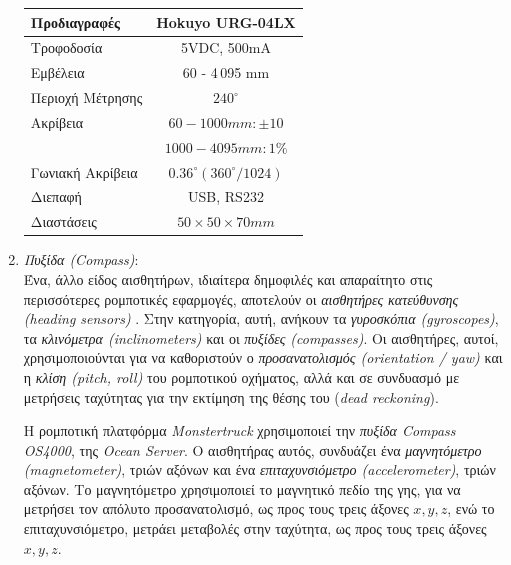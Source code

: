 \begin{enumerate}
\begin{table}[!ht]
	\centering
	\label{tab:hokuyo_specs}
	\begin{tabular}{| l | c |}
		\hline
	   \textbf{Προδιαγραφές} & \textbf{Hokuyo URG-04LX} \\ \hline
	   Τροφοδοσία & 5VDC, 500mA\\ \hline
	   Εμβέλεια & 60 - 4\,095 mm \\ \hline
	   Περιοχή Μέτρησης & $240^{\circ}$\\ \hline
	   Ακρίβεια & $60 - 1000mm: \pm 10$ \\
   		& $1000 - 4095mm: 1\%$ \\ \hline
	  	Γωνιακή Ακρίβεια & $0.36^{\circ} (360^{\circ}/1024)$ \\ \hline
	  	Διεπαφή & USB, RS232 \\ \hline
	  	Διαστάσεις & $50 \times 50 \times 70 mm$ \\ \hline
	\end{tabular}
\end{table}

\bigskip
\item \textit{Πυξίδα (Compass)}:\\
Ένα, άλλο είδος αισθητήρων, ιδιαίτερα δημοφιλές και απαραίτητο στις περισσότερες ρομποτικές εφαρμογές, αποτελούν οι \textit{αισθητήρες κατεύθυνσης (heading sensors)} \cite{autonomous_mobile_robots}. Στην κατηγορία, αυτή, ανήκουν τα \textit{γυροσκόπια (gyroscopes)}, τα \textit{κλινόμετρα (inclinometers)} και οι \textit{πυξίδες (compasses)}. Οι αισθητήρες, αυτοί, χρησιμοποιούνται για να καθοριστούν ο \textit{προσανατολισμός (orientation / yaw)} και η \textit{κλίση (pitch, roll)} του ρομποτικού οχήματος, αλλά και σε συνδυασμό με μετρήσεις ταχύτητας για την εκτίμηση της θέσης του (\textit{dead reckoning}).

Η ρομποτική πλατφόρμα \textit{Monstertruck} χρησιμοποιεί την \textit{πυξίδα Compass OS4000}, της \textit{Ocean Server}. Ο αισθητήρας αυτός, συνδυάζει ένα \textit{μαγνητόμετρο (magnetometer)}, τριών αξόνων και ένα \textit{επιταχυνσιόμετρο (accelerometer)}, τριών αξόνων. Το μαγνητόμετρο χρησιμοποιεί το μαγνητικό πεδίο της γης, για να μετρήσει τον απόλυτο προσανατολισμό, ως προς τους τρεις άξονες $x, y, z$, ενώ το επιταχυνσιόμετρο, μετράει μεταβολές στην ταχύτητα, ως προς τους τρεις άξονες $x, y, z$.


\end{enumerate}
